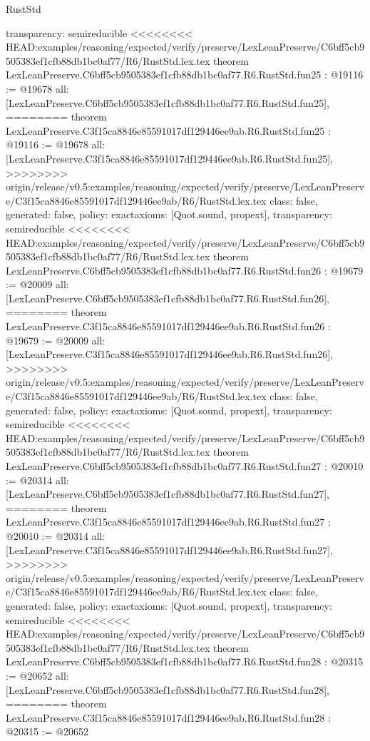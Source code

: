 \begin{lexlean}{RustStd}
\begin{coremodule}
{\begin{coremodule}
{{{{{{{{{{{{{{{{{{{{{{{{{{{{  transparency: semireducible
}
<<<<<<<< HEAD:examples/reasoning/expected/verify/preserve/LexLeanPreserve/C6bff5cb9505383ef1cfb88db1bc0af77/R6/RustStd.lex.tex
theorem LexLeanPreserve.C6bff5cb9505383ef1cfb88db1bc0af77.R6.RustStd.fun25 : @19116 := @19678 {
  all: [LexLeanPreserve.C6bff5cb9505383ef1cfb88db1bc0af77.R6.RustStd.fun25],
========
theorem LexLeanPreserve.C3f15ca8846e85591017df129446ee9ab.R6.RustStd.fun25 : @19116 := @19678 {
  all: [LexLeanPreserve.C3f15ca8846e85591017df129446ee9ab.R6.RustStd.fun25],
>>>>>>>> origin/release/v0.5:examples/reasoning/expected/verify/preserve/LexLeanPreserve/C3f15ca8846e85591017df129446ee9ab/R6/RustStd.lex.tex
  class: false,
  generated: false,
  policy: exact{axioms: [Quot.sound, propext]},
  transparency: semireducible
}
<<<<<<<< HEAD:examples/reasoning/expected/verify/preserve/LexLeanPreserve/C6bff5cb9505383ef1cfb88db1bc0af77/R6/RustStd.lex.tex
theorem LexLeanPreserve.C6bff5cb9505383ef1cfb88db1bc0af77.R6.RustStd.fun26 : @19679 := @20009 {
  all: [LexLeanPreserve.C6bff5cb9505383ef1cfb88db1bc0af77.R6.RustStd.fun26],
========
theorem LexLeanPreserve.C3f15ca8846e85591017df129446ee9ab.R6.RustStd.fun26 : @19679 := @20009 {
  all: [LexLeanPreserve.C3f15ca8846e85591017df129446ee9ab.R6.RustStd.fun26],
>>>>>>>> origin/release/v0.5:examples/reasoning/expected/verify/preserve/LexLeanPreserve/C3f15ca8846e85591017df129446ee9ab/R6/RustStd.lex.tex
  class: false,
  generated: false,
  policy: exact{axioms: [Quot.sound, propext]},
  transparency: semireducible
}
<<<<<<<< HEAD:examples/reasoning/expected/verify/preserve/LexLeanPreserve/C6bff5cb9505383ef1cfb88db1bc0af77/R6/RustStd.lex.tex
theorem LexLeanPreserve.C6bff5cb9505383ef1cfb88db1bc0af77.R6.RustStd.fun27 : @20010 := @20314 {
  all: [LexLeanPreserve.C6bff5cb9505383ef1cfb88db1bc0af77.R6.RustStd.fun27],
========
theorem LexLeanPreserve.C3f15ca8846e85591017df129446ee9ab.R6.RustStd.fun27 : @20010 := @20314 {
  all: [LexLeanPreserve.C3f15ca8846e85591017df129446ee9ab.R6.RustStd.fun27],
>>>>>>>> origin/release/v0.5:examples/reasoning/expected/verify/preserve/LexLeanPreserve/C3f15ca8846e85591017df129446ee9ab/R6/RustStd.lex.tex
  class: false,
  generated: false,
  policy: exact{axioms: [Quot.sound, propext]},
  transparency: semireducible
}
<<<<<<<< HEAD:examples/reasoning/expected/verify/preserve/LexLeanPreserve/C6bff5cb9505383ef1cfb88db1bc0af77/R6/RustStd.lex.tex
theorem LexLeanPreserve.C6bff5cb9505383ef1cfb88db1bc0af77.R6.RustStd.fun28 : @20315 := @20652 {
  all: [LexLeanPreserve.C6bff5cb9505383ef1cfb88db1bc0af77.R6.RustStd.fun28],
========
theorem LexLeanPreserve.C3f15ca8846e85591017df129446ee9ab.R6.RustStd.fun28 : @20315 := @20652 {
}}}}}}}}}}}}}}}}}}}}}}}}}}}}}}}}
\end{coremodule}}
\end{coremodule}
\end{lexlean}

